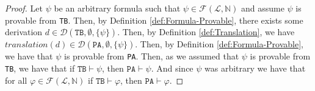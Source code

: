 \begin{proof}
    Let $\psi$ be an arbitrary formula such that $\psi \in \mathcal{F}(\mathcal{L},\mathbb{N})$ and assume $\psi$ is provable from \texttt{TB}. Then, by Definition \ref{def:Formula-Provable}, there exists some derivation $d \in \mathcal{D}(\texttt{TB},\emptyset,\{\psi\})$. Then, by Definition \ref{def:Translation}, we have $translation(d) \in \mathcal{D}(\texttt{PA},\emptyset,\{\psi\})$. Then, by Definition \ref{def:Formula-Provable}, we have that $\psi$ is provable from \texttt{PA}. Then, as we assumed that $\psi$ is provable from \texttt{TB}, we have that if $\texttt{TB} \vdash \psi$, then $\texttt{PA} \vdash \psi$. And since $\psi$ was arbitrary we have that for all $\varphi \in \mathcal{F}(\mathcal{L}, \mathbb{N})$ if $\texttt{TB} \vdash \varphi$, then $\texttt{PA} \vdash \varphi$.
\end{proof}



